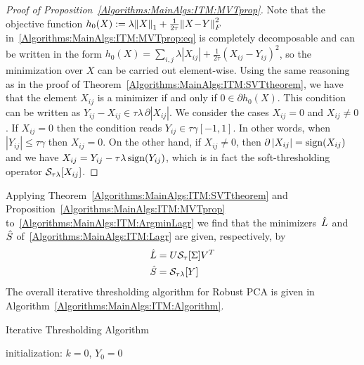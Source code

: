 \documentclass{../../common/projectreport}
\begin{document}
\begin{proof}[Proof of Proposition~\ref{Algorithms:MainAlgs:ITM:MVTprop}] 
Note that the objective function $h_0(X) := \lambda {\left\|X\right\|}_{1}^{} + \frac{1}{2\tau} {\left\|X\!-\!Y\right\|}_{F}^{2}$ in~\eqref{Algorithms:MainAlgs:ITM:MVTprop:eq} is completely decomposable and can be written in the form $h_0(X) = \sum_{i,j} \lambda |X_{ij}| + \frac{1}{2\tau} (X_{ij}\!-\!Y_{ij})^2$, so the minimization over $X$ can be carried out element-wise. Using the same reasoning as in the proof of Theorem~\ref{Algorithms:MainAlgs:ITM:SVTtheorem}, we have that the element $X_{ij}$ is a minimizer if and only if $0 \in \partial h_0(X)$. This condition can be written as $Y_{ij}-X_{ij} \in \tau \lambda\, \partial |X_{ij}|$. We consider the cases $X_{ij} =0$ and $X_{ij} \neq 0$. If $X_{ij} =0$ then the condition reads $Y_{ij} \in \tau \gamma [-1,1]$. In other words, when $|Y_{ij}| \leq \tau \gamma$ then $X_{ij}=0$. On the other hand, if $X_{ij} \neq 0$, then  $\partial \, |X_{ij}| = \operatorname{sign}(X_{ij})$ and we have $X_{ij}= Y_{ij} -\tau\lambda \operatorname{sign}(Y_{ij})$, which is in fact the soft-thresholding operator ${\mathcal{S}}_{\tau\lambda}[X_{ij}]$.
\end{proof}


Applying Theorem~\ref{Algorithms:MainAlgs:ITM:SVTtheorem} and Proposition~\ref{Algorithms:MainAlgs:ITM:MVTprop} to~\eqref{Algorithms:MainAlgs:ITM:ArgminLagr} we find that the minimizers~${\hat{L}}$ and~${\hat{S}}$ of~\eqref{Algorithms:MainAlgs:ITM:Lagr} are given, respectively, by 
%
\begin{align}
{\hat{L}} &= U {\mathcal{S}}_\tau[\Sigma] V^T
\label{Algorithms:MainAlgs:ITM:ArgminLhat} \\
{\hat{S}} &= {\mathcal{S}}_{\tau\lambda}[Y]
\label{Algorithms:MainAlgs:ITM:ArgminShat}
\end{align}
%
%
The overall iterative thresholding algorithm for Robust PCA is given in Algorithm~\ref{Algorithms:MainAlgs:ITM:Algorithm}. 
%
\begin{algorithm}
\caption{Iterative Thresholding Algorithm}
initialization: $k=0$, $Y_0 = 0$\;
\label{Algorithms:MainAlgs:ITM:Algorithm}
\end{algorithm}
\end{document}
